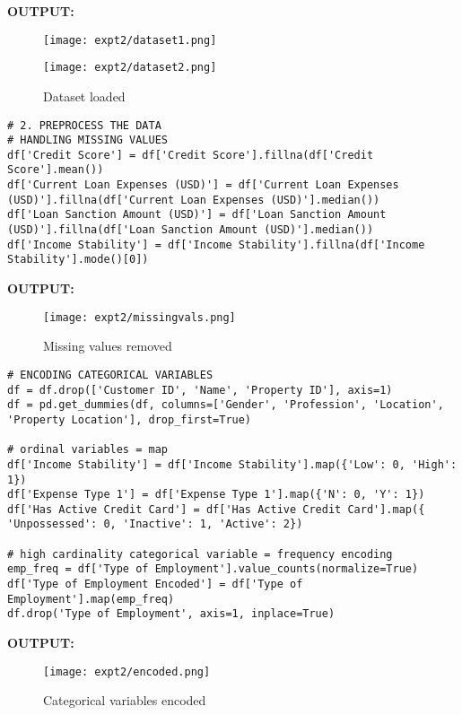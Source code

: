 \documentclass[11pt]{article}
\begin{document}
\vspace{0.4cm}
\textbf{OUTPUT:}
\begin{figure}[h!]
\centering
\texttt{[image: expt2/dataset1.png]} 
\end{figure}

\begin{figure}[h!]
\centering
\texttt{[image: expt2/dataset2.png]} 
\caption{Dataset loaded}
\end{figure}

\begin{verbatim}
# 2. PREPROCESS THE DATA
# HANDLING MISSING VALUES
df['Credit Score'] = df['Credit Score'].fillna(df['Credit Score'].mean())
df['Current Loan Expenses (USD)'] = df['Current Loan Expenses (USD)'].fillna(df['Current Loan Expenses (USD)'].median())
df['Loan Sanction Amount (USD)'] = df['Loan Sanction Amount (USD)'].fillna(df['Loan Sanction Amount (USD)'].median())
df['Income Stability'] = df['Income Stability'].fillna(df['Income Stability'].mode()[0])
\end{verbatim}

\textbf{OUTPUT:}
\begin{figure}[h!]
\centering
\texttt{[image: expt2/missingvals.png]} 
\caption{Missing values removed}
\end{figure}

\begin{verbatim}
# ENCODING CATEGORICAL VARIABLES
df = df.drop(['Customer ID', 'Name', 'Property ID'], axis=1)
df = pd.get_dummies(df, columns=['Gender', 'Profession', 'Location', 
'Property Location'], drop_first=True)

# ordinal variables = map
df['Income Stability'] = df['Income Stability'].map({'Low': 0, 'High': 1})
df['Expense Type 1'] = df['Expense Type 1'].map({'N': 0, 'Y': 1})
df['Has Active Credit Card'] = df['Has Active Credit Card'].map({
'Unpossessed': 0, 'Inactive': 1, 'Active': 2})

# high cardinality categorical variable = frequency encoding
emp_freq = df['Type of Employment'].value_counts(normalize=True)
df['Type of Employment Encoded'] = df['Type of Employment'].map(emp_freq)
df.drop('Type of Employment', axis=1, inplace=True)
\end{verbatim}

\textbf{OUTPUT:}
\begin{figure}[h!]
\centering
\texttt{[image: expt2/encoded.png]} 
\caption{Categorical variables encoded}
\end{figure}
\end{document}
